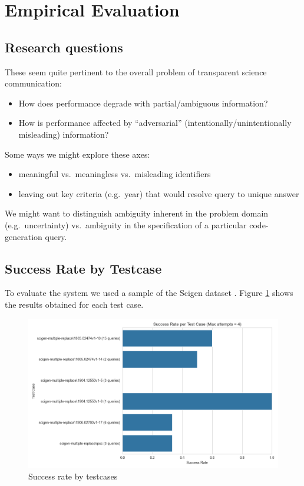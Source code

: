 \section{Empirical Evaluation}
\label{sec:evaluation}

\subsection{Research questions}

These seem quite pertinent to the overall problem of transparent science communication:
\begin{itemize}
\item How does performance degrade with partial/ambiguous information?
\item How is performance affected by ``adversarial'' (intentionally/unintentionally misleading) information?
\end{itemize}

Some ways we might explore these axes:
\begin{itemize}
\item meaningful vs.~meaningless vs.~misleading identifiers
\item leaving out key criteria (e.g.~year) that would resolve query to unique answer
\end{itemize}

We might want to distinguish ambiguity inherent in the problem domain (e.g.~uncertainty) vs.~ambiguity in the
specification of a particular code-generation query.

\subsection{Success Rate by Testcase}
To evaluate the system we used a sample of the Scigen dataset \cite{scigen_dataset_2021}.
Figure \ref{fig:success_rate_by_test_case} shows the results obtained for each test case.

\label{subsec:success_rate_by_test_case}

\begin{figure}[!h]
    \centering
    \includegraphics[width=0.95\linewidth]{fig/success_rate_by_test_case}
    \caption{Success rate by testcases}\label{fig:success_rate_by_test_case}
\end{figure}

